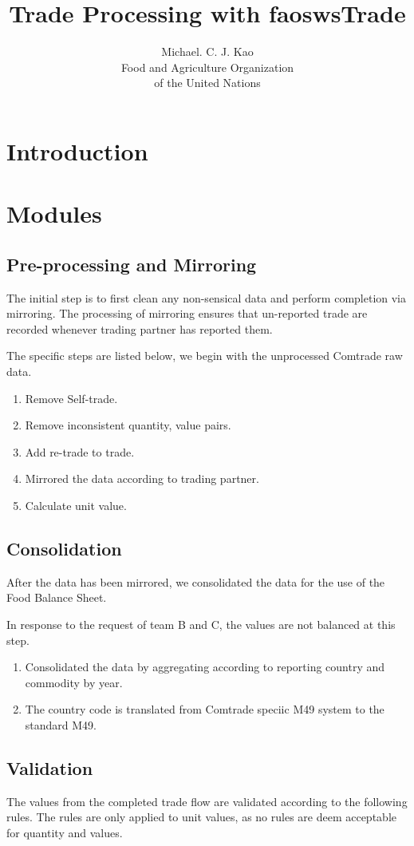 \documentclass[nojss]{jss}
\title{\bf Trade Processing with faoswsTrade}
\author{Michael. C. J. Kao\\ Food and Agriculture Organization \\ of
  the United Nations}
\begin{document}
\section{Introduction}



\section{Modules}


\subsection{Pre-processing and Mirroring}

The initial step is to first clean any non-sensical data and perform
completion via mirroring. The processing of mirroring ensures that
un-reported trade are recorded whenever trading partner has reported
them.

The specific steps are listed below, we begin with the unprocessed
Comtrade raw data.

\begin{enumerate}
  \item Remove Self-trade.
  \item Remove inconsistent quantity, value pairs.
  \item Add re-trade to trade.
  \item Mirrored the data according to trading partner.
  \item Calculate unit value.
\end{enumerate}

\subsection{Consolidation}

After the data has been mirrored, we consolidated the data for the use
of the Food Balance Sheet.

In response to the request of team B and C, the values are not
balanced at this step. 

\begin{enumerate}
  \item Consolidated the data by aggregating according to reporting
    country and commodity by year.
  \item The country code is translated from Comtrade speciic M49
    system to the standard M49.
\end{enumerate}


\subsection{Validation}
The values from the completed trade flow are validated according to
the following rules. The rules are only applied to unit values, as no
rules are deem acceptable for quantity and values.
\end{document}
